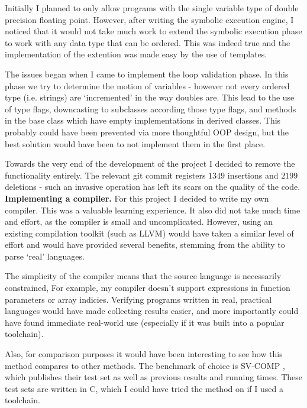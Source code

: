 \documentclass[12pt,a4paper]{article}
\begin{document}
Initially I planned to only allow programs with the single variable type
of double precision floating point. However, after writing the symbolic execution engine, I noticed that it would not take much work to extend the symbolic execution phase to work with any
data type that can be ordered. This was indeed true and the implementation of the extention was made easy by the use of templates.

The issues began when I came to implement the loop validation phase. In this phase we try to determine the motion of variables - however not every ordered type (i.e. strings) are `incremented' in the way doubles are. This lead to the use of type flags, downcasting to subclasses according those type flags, and methods in the
base class which have empty implementations in derived classes. This probably could have been prevented via more thoughtful OOP design, but the best solution would
have been to not implement them in the first place.

Towards the very end of the development of the project I decided to remove the functionality entirely. The relevant git commit registers
$1349$ insertions and $2199$ deletions - such an invasive operation has left its scars on the quality of the code.
\\

\textbf{Implementing a compiler.} For this project I decided to write my own compiler. This was a valuable learning experience. It also did not take much time and effort, as the compiler is small
and uncomplicated. However, using an existing compilation toolkit (such as LLVM) would have taken a similar level of effort and would have provided several benefits,
stemming from the ability to parse `real' languages.

The simplicity of the compiler means that the source language is necessarily constrained, For example, my compiler doesn't support 
expressions in function parameters or array indicies. Verifying programs written in real, practical languages would have made collecting results easier, and more 
importantly could have found immediate real-world use (especially if it was built into a popular toolchain).

Also, for comparison purposes it would have been interesting to see how this method
compares to other methods. The benchmark of choice is SV-COMP \citep{svcomp}, which publishes their test set as well as previous results and running times. These
test sets are written in C, which I could have tried the method on if I used a toolchain.\\
\end{document}
